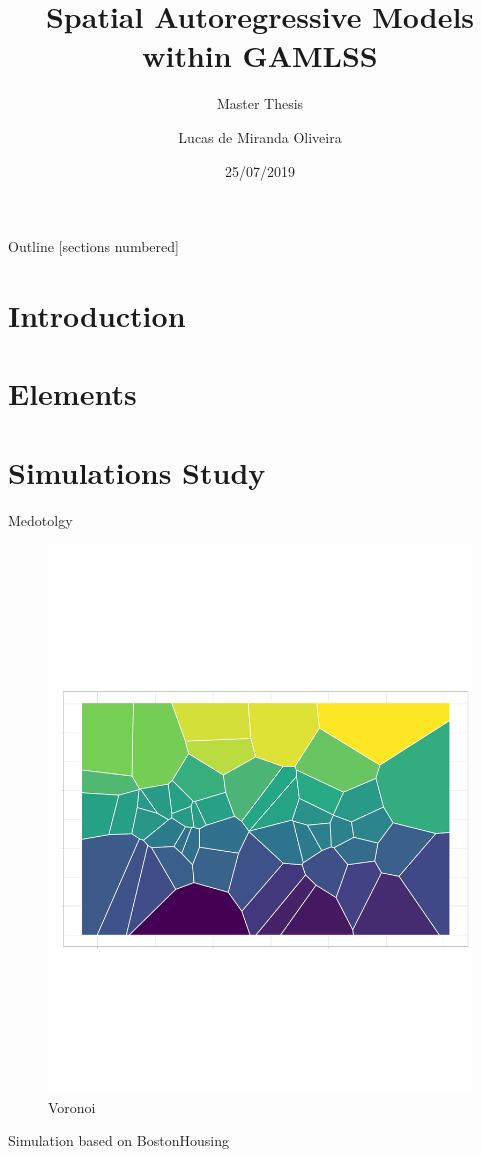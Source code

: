 \documentclass[10pt]{beamer}
\title{Spatial Autoregressive Models within GAMLSS}
\subtitle{Master Thesis}
\date{25/07/2019}
\author{Lucas de Miranda Oliveira}
\institute{UFPE}
\begin{document}
\maketitle

\begin{frame}{Outline}
  [sections numbered]
  \tableofcontents[hideallsubsections]
\end{frame}

\section{Introduction}


\section{Elements}
\section{Simulations Study}
\begin{frame}{Medotolgy}
  \begin{figure}
\centering
\includegraphics[width=0.7\linewidth]{VoroniDiagrams.pdf}
\caption{Voronoi}
\label{fig:Columbus_Sub}
\end{figure}
\end{frame}


\begin{frame}{Simulation based on BostonHousing}

\end{frame}
\end{document}
